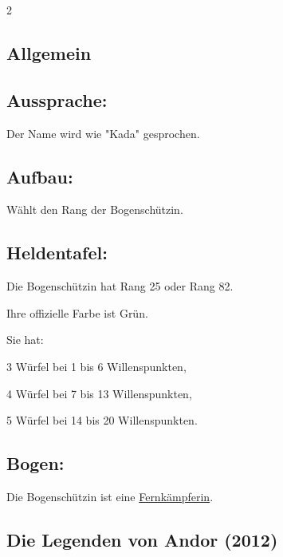 \documentclass[10pt, a4paper, oneside]{book}
\begin{document}
\begin{multicols*}{2}\raggedcolumns


\begin{nobgcolor}

\section{Allgemein}

\subsection{Aussprache:}


Der Name wird wie "Kada" gesprochen.
\supercite{26518,33469}




\subsection{Aufbau:}

Wählt den Rang der Bogenschützin.



\subsection{Heldentafel:}

Die Bogenschützin hat Rang 25 oder Rang 82.

Ihre offizielle Farbe ist Grün.

Sie hat:

\bullet{} 3 Würfel bei 1 bis 6 Willenspunkten,

\bullet{} 4 Würfel bei 7 bis 13 Willenspunkten,

\bullet{} 5 Würfel bei 14 bis 20 Willenspunkten.




\subsection{Bogen:}

Die Bogenschützin ist eine \hyperref[Fernkämpfer]{Fernkämpferin}.



\end{nobgcolor}


\begin{bgcolor}
\section{Die Legenden von Andor (2012)}



\end{bgcolor}
\end{multicols*}
\end{document}

